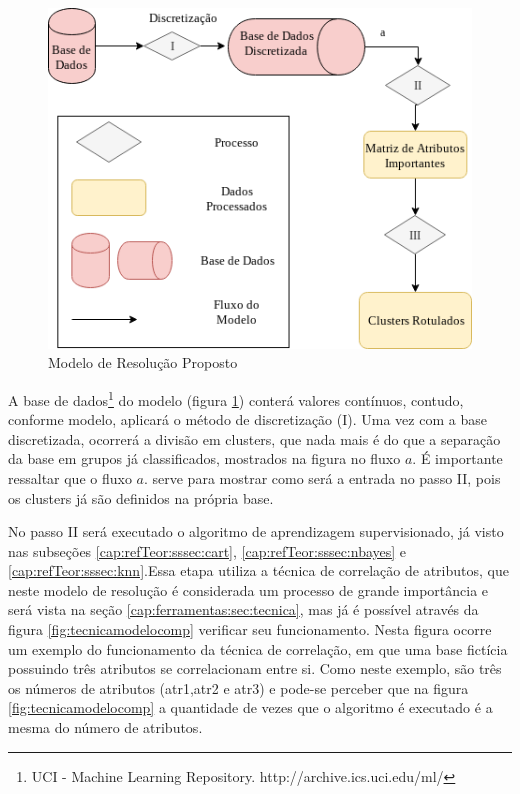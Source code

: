 \begin{figure}[h!]
        \centering
        \includegraphics[scale=0.7]{figs/modeloResolucao.png}
        \caption{Modelo de Resolução Proposto} \label{fig:modeloresolucao}
\end{figure}

A base de dados\footnote{UCI - Machine Learning Repository. http://archive.ics.uci.edu/ml/} do modelo (figura \ref{fig:modeloresolucao}) conterá valores contínuos, contudo, conforme modelo, aplicará o método de discretização (I). Uma vez com a base discretizada, ocorrerá a divisão em clusters, que nada mais é do que a separação da base em grupos já classificados, mostrados na figura no fluxo  ${a}$. É importante ressaltar que o fluxo  ${a}$. serve para mostrar como será a entrada no passo II, pois os clusters já são definidos na própria base. 

No passo II será executado o algoritmo de aprendizagem supervisionado, já visto nas subseções \ref{cap:refTeor:sssec:cart}, \ref{cap:refTeor:sssec:nbayes} e \ref{cap:refTeor:sssec:knn}.Essa etapa utiliza a técnica de correlação de atributos, que neste modelo de resolução é considerada um processo de grande importância e será vista na seção   \ref{cap:ferramentas:sec:tecnica}, mas já é possível através da figura \ref{fig:tecnicamodelocomp} verificar seu funcionamento. Nesta figura ocorre um exemplo do funcionamento da técnica de correlação, em que uma base fictícia possuindo três atributos se correlacionam entre si. Como neste exemplo, são três os números de atributos (atr1,atr2 e atr3) e pode-se perceber que na figura \ref{fig:tecnicamodelocomp} a quantidade de vezes que o algoritmo é executado é a mesma do número de atributos.

